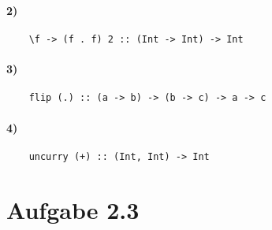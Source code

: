 \documentclass[a4paper]{scrartcl}
\begin{document}
\paragraph{2)}
\begin{verbatim}
    \f -> (f . f) 2 :: (Int -> Int) -> Int
\end{verbatim}

\paragraph{3)}
\begin{verbatim}
    flip (.) :: (a -> b) -> (b -> c) -> a -> c
\end{verbatim}

\paragraph{4)}
\begin{verbatim}
    uncurry (+) :: (Int, Int) -> Int
\end{verbatim}


\section{Aufgabe 2.3}
\inputminted{haskell}{collatz.hs}
\end{document}
